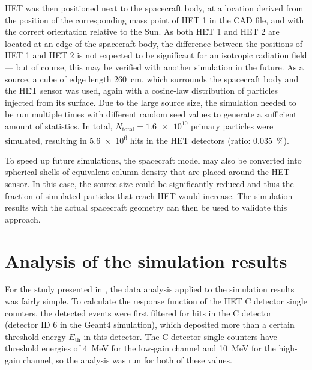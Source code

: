 HET was then positioned next to the spacecraft body, at a location derived from the position of the corresponding mass point of HET 1 in the CAD file, and with the correct orientation relative to the Sun. As both HET 1 and HET 2 are located at an edge of the spacecraft body, the difference between the positions of HET 1 and HET 2 is not expected to be significant for an isotropic radiation field --- but of course, this may be verified with another simulation in the future. As a source, a cube of edge length \SI{260}{\centi\meter}, which surrounds the spacecraft body and the HET sensor was used, again with a cosine-law distribution of particles injected from its surface. Due to the large source size, the simulation needed to be run multiple times with different random seed values to generate a sufficient amount of statistics. In total, $N_\text{total} = \num{1.6e10}$ primary particles were simulated, resulting in \num{5.6e6} hits in the HET detectors (ratio: \SI{0.035}{\percent}).

To speed up future simulations, the spacecraft model may also be converted into spherical shells of equivalent column density that are placed around the HET sensor. In this case, the source size could be significantly reduced and thus the fraction of simulated particles that reach HET would increase. The simulation results with the actual spacecraft geometry can then be used to validate this approach.

\section{Analysis of the simulation results}

For the study presented in \citet{Forstner-2021-SolO}, the data analysis applied to the simulation results was fairly simple. To calculate the response function of the HET C detector single counters, the detected events were first filtered for hits in the C detector (detector ID 6 in the Geant4 simulation), which deposited more than a certain threshold energy $E_\text{th}$ in this detector. The C detector single counters have threshold energies of \SI{4}{\mega\electronvolt} for the low-gain channel and \SI{10}{\mega\electronvolt} for the high-gain channel, so the analysis was run for both of these values.

